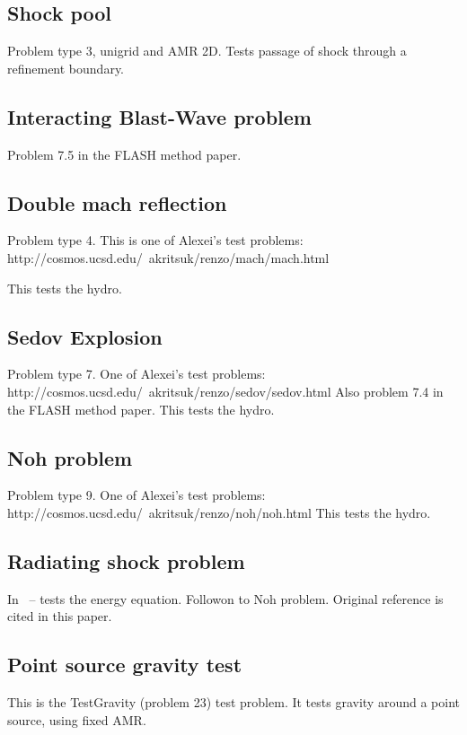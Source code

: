 \subsection{Shock pool}\label{sec.tests.shockpool}
Problem type 3, unigrid and AMR 2D.  Tests passage of shock through a refinement boundary.

\subsection{Interacting Blast-Wave problem}\label{sec.tests.interblast}
Problem 7.5 in the FLASH method paper.


\subsection{Double mach reflection}\label{sec.tests.doublemach}
Problem type 4.  This is one of Alexei's test problems: 
http://cosmos.ucsd.edu/~akritsuk/renzo/mach/mach.html

This tests the hydro.

\subsection{Sedov Explosion}\label{sec.tests.sedov}
Problem type 7.  One of Alexei's test problems:
http://cosmos.ucsd.edu/~akritsuk/renzo/sedov/sedov.html
Also problem 7.4 in the FLASH method paper.
This tests the hydro.

\subsection{Noh problem}\label{sec.tests.noh}
Problem type 9.  One of Alexei's test problems:
http://cosmos.ucsd.edu/~akritsuk/renzo/noh/noh.html
This tests the hydro.

\subsection{Radiating shock problem}\label{sec.test.radshock}
In~\citet{anninos97} -- tests the energy equation.  Followon
to Noh problem.  Original reference is cited in this paper.

\subsection{Point source gravity test}\label{sec.test.gravitypointsource}
This is the TestGravity (problem 23) test problem.  It tests gravity around a point source, using fixed AMR.

